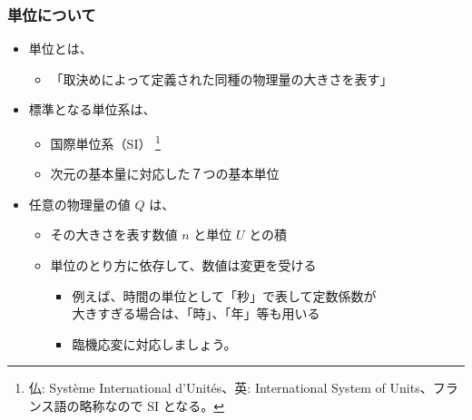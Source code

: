 \documentclass[12pt, dvipdfmx]{beamer}
\begin{document}
\begin{frame}
	\frametitle{単位について}
	\begin{itemize}
		\item 単位とは、
		\begin{itemize}
			\item 「取決めによって定義された同種の物理量の大きさを表す」
		\end{itemize}
		\item 標準となる単位系は、
		\begin{itemize}
			\item 国際単位系（SI）
			\footnote{仏: Syst\`eme International d'Unit\'es、英: International System of Units、フランス語の略称なので SI となる。}
			\item 次元の基本量に対応した７つの基本単位
		\end{itemize}
		\item 任意の物理量の値 $Q$ は、
		\begin{itemize}
			\item その大きさを表す数値 $n$ と単位 $U$ との積
			\item 単位のとり方に依存して、数値は変更を受ける
			\begin{itemize}
				\item 例えば、時間の単位として「秒」で表して定数係数が\\大きすぎる場合は、「時」、「年」等も用いる
				\item 臨機応変に対応しましょう。
			\end{itemize}
		\end{itemize}
	\end{itemize}
\end{frame}
\end{document}
